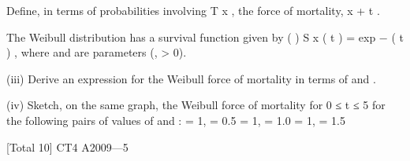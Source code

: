 Define, in terms of probabilities involving T x , the force of mortality, \mu x + t .

The Weibull distribution has a survival function given by
(
)
S x ( t ) = exp − ( \lambda t ) \beta ,
where \lambda and \beta are parameters (\lambda, \beta > 0).
\item (iii)
Derive an expression for the Weibull force of mortality in terms of \lambda and \beta.

(iv)
Sketch, on the same graph, the Weibull force of mortality for 0 ≤ t ≤ 5 for the
following pairs of values of \lambda and \beta:
\lambda = 1, \beta = 0.5
\lambda = 1, \beta = 1.0
\lambda = 1, \beta = 1.5

[Total 10]
CT4 A2009—5




